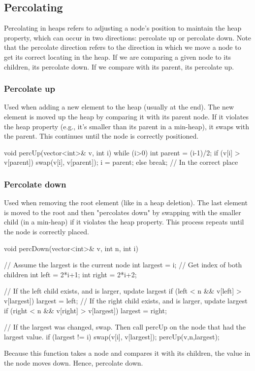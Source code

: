 \documentclass{report}
\begin{document}
\pagebreak 
\subsection{Percolating}
\bigbreak \noindent 
Percolating in heaps refers to adjusting a node’s position to maintain the heap property, which can occur in two directions: percolate up or percolate down.
\bigbreak \noindent 
Note that the percolate direction refers to the direction in which we move a node to get its correct locating in the heap.
\bigbreak \noindent 
If we are comparing a given node to its children, its percolate down. If we compare with its parent, its percolate up.

\bigbreak \noindent 
\subsubsection{Percolate up}
\bigbreak \noindent 
Used when adding a new element to the heap (usually at the end). The new element is moved up the heap by comparing it with its parent node. If it violates the heap property (e.g., it’s smaller than its parent in a min-heap), it swaps with the parent. This continues until the node is correctly positioned.
\bigbreak \noindent 
\begin{cppcode}
void percUp(vector<int>& v, int i) {
    while (i>0) {
        int parent = (i-1)/2;
        if (v[i] > v[parent]) {
            swap(v[i], v[parent]);
            i = parent;
        } else break; // In the correct place
    }
}
\end{cppcode}


\pagebreak \bigbreak \noindent 
\subsubsection{Percolate down}
\bigbreak \noindent 
Used when removing the root element (like in a heap deletion). The last element is moved to the root and then "percolates down" by swapping with the smaller child (in a min-heap) if it violates the heap property. This process repeats until the node is correctly placed.
\bigbreak \noindent 
\begin{cppcode}
    void percDown(vector<int>& v, int n, int i) {
        // Assume the largest is the current node
        int largest = i;
        // Get index of both children
        int left = 2*i+1;
        int right = 2*i+2;

        // If the left child exists, and is larger, update largest
        if (left < n && v[left] > v[largest]) {
            largest = left;
        }
        // If the right child exists, and is larger, update largest
        if (right < n && v[right] > v[largest]) {
            largest = right;
        }

        // If the largest was changed, swap. Then call percUp on the node that had the largest value.
        if (largest != i) {
            swap(v[i], v[largest]);
            percUp(v,n,largest);
        }
    }
\end{cppcode}
\bigbreak \noindent 
Because this function takes a node and compares it with its children, the value in the node moves down. Hence, percolate down.
\end{document}
